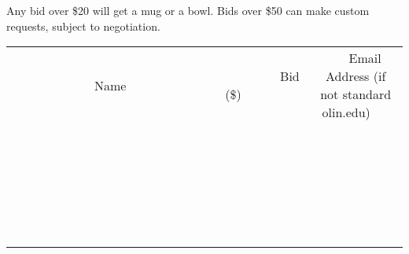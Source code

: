 \documentclass[11pt]{article}
\begin{document}
Any bid over \$20 will get a mug or a bowl.  Bids over \$50 can make custom requests, subject to negotiation. \\[6ex]
\begin{tabular}{c c c}
~~~~~~~~~~~~~Name~~~~~~~~~~~~~ & ~~~~~~~~~Bid (\$)~~~~~~~~~ & ~~~Email Address (if not standard olin.edu)~~~ \\
 & & \\
\hline
 & & \\
\hline
 & & \\
\hline
 & & \\
\hline
 & & \\
\hline
 & & \\
\hline
 & & \\
\hline
 & & \\
\hline
 & & \\
\hline
 & & \\
\hline
 & & \\
\hline
 & & \\
\hline
 & & \\
\hline
 & & \\
\hline
 & & \\
\hline
 & & \\
\hline
 & & \\
\hline
 & & \\
\hline
 & & \\
\hline
 & & \\
\hline
 & & \\
\hline
 & & \\
\hline
 & & \\
\hline
 & & \\
\hline
 & & \\
\hline
 & & \\
\hline
\end{tabular}
\clearpage
\end{document}
